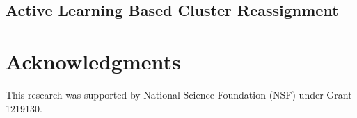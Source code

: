 \documentclass[journal]{IEEEtran}
\begin{document}
\subsection{Active Learning Based Cluster Reassignment}

\section*{Acknowledgments}
This research was supported by National Science Foundation (NSF) under Grant 1219130.
 






\ifCLASSOPTIONcaptionsoff
  \newpage
\fi



\end{document}

